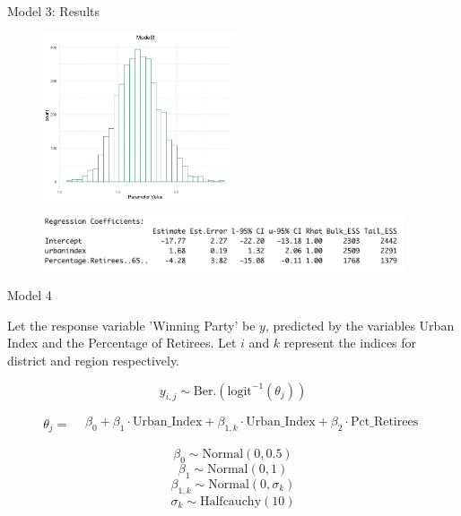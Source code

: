 \documentclass{beamer}
\begin{document}
\begin{frame}{Model 3: Results}
    \begin{figure}
        \includegraphics[width=0.5\textwidth]{plots/model3_postui.png}
    \end{figure}
    \begin{figure}
        \includegraphics[width=0.95\textwidth]{plots/model3_coeff.png}
    \end{figure}
\end{frame}


\begin{frame}{Model 4}

    Let the response variable 'Winning Party' be \(y\), predicted by the variables Urban Index and the Percentage of Retirees. Let \(i\) and \(k\) represent the indices for district and region respectively.

    \[
    y_{i,j} \sim \text{Ber.}\left(\text{logit}^{-1}(\theta_{j})\right)
    \]

\[
\theta_{j} =
\begin{aligned}
    &\beta_0 + \beta_1 \cdot \text{Urban\_Index} + \beta_{1,k} \cdot \text{Urban\_Index} + \beta_2 \cdot \text{Pct\_Retirees}
\end{aligned}
\]

    \[\beta_0 \sim \text{Normal}(0, 0.5)\]
    \[\beta_1 \sim \text{Normal}(0, 1)\]
    \[\beta_{1,k} \sim \text{Normal}(0, \sigma_k)\]
    \[ \sigma_k \sim \text{Halfcauchy}(10)\]
    
\end{frame}
\end{document}
